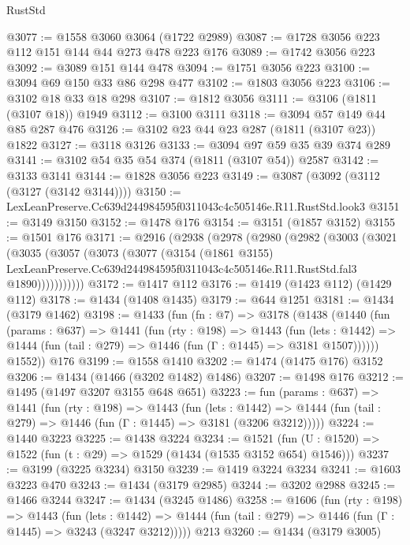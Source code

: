 \begin{lexlean}{RustStd}
\begin{coremodule}
@3077 := @1558 @3060 @3064 (@1722 @2989)
@3087 := @1728 @3056 @223 @112 @151 @144 @44 @273 @478 @223 @176
@3089 := @1742 @3056 @223
@3092 := @3089 @151 @144 @478
@3094 := @1751 @3056 @223
@3100 := @3094 @69 @150 @33 @86 @298 @477
@3102 := @1803 @3056 @223
@3106 := @3102 @18 @33 @18 @298
@3107 := @1812 @3056
@3111 := @3106 (@1811 (@3107 @18)) @1949
@3112 := @3100 @3111
@3118 := @3094 @57 @149 @44 @85 @287 @476
@3126 := @3102 @23 @44 @23 @287 (@1811 (@3107 @23)) @1822
@3127 := @3118 @3126
@3133 := @3094 @97 @59 @35 @39 @374 @289
@3141 := @3102 @54 @35 @54 @374 (@1811 (@3107 @54)) @2587
@3142 := @3133 @3141
@3144 := @1828 @3056 @223
@3149 := @3087 (@3092 (@3112 (@3127 (@3142 @3144))))
@3150 := LexLeanPreserve.Cc639d244984595f0311043c4c505146e.R11.RustStd.look3
@3151 := @3149 @3150
@3152 := @1478 @176
@3154 := @3151 (@1857 @3152)
@3155 := @1501 @176
@3171 := @2916
    (@2938
      (@2978
        (@2980
          (@2982
            (@3003
              (@3021
                (@3035
                  (@3057
                    (@3073
                      (@3077
                        (@3154
                          (@1861 @3155)
                          LexLeanPreserve.Cc639d244984595f0311043c4c505146e.R11.RustStd.fal3
                          @1890)))))))))))
@3172 := @1417 @112
@3176 := @1419 (@1423 @112) (@1429 @112)
@3178 := @1434 (@1408 @1435)
@3179 := @644 @1251
@3181 := @1434 (@3179 @1462)
@3198 := @1433
    (fun (fn : @7) =>
    @3178
      (@1438
        (@1440
          (fun (params : @637) =>
          @1441
            (fun (rty : @198) =>
            @1443
              (fun (lets : @1442) =>
              @1444 (fun (tail : @279) => @1446 (fun (Γ : @1445) => @3181 @1507))))))
        @1552))
    @176
@3199 := @1558 @1410
@3202 := @1474 (@1475 @176) @3152
@3206 := @1434 (@1466 (@3202 @1482) @1486)
@3207 := @1498 @176
@3212 := @1495 (@1497 @3207 @3155 @648 @651)
@3223 := fun (params : @637) =>
  @1441
    (fun (rty : @198) =>
    @1443
      (fun (lets : @1442) =>
      @1444 (fun (tail : @279) => @1446 (fun (Γ : @1445) => @3181 (@3206 @3212)))))
@3224 := @1440 @3223
@3225 := @1438 @3224
@3234 := @1521 (fun (U : @1520) => @1522 (fun (t : @29) => @1529 (@1434 (@1535 @3152 @654) @1546)))
@3237 := @3199 (@3225 @3234) @3150
@3239 := @1419 @3224 @3234
@3241 := @1603 @3223 @470
@3243 := @1434 (@3179 @2985)
@3244 := @3202 @2988
@3245 := @1466 @3244
@3247 := @1434 (@3245 @1486)
@3258 := @1606
    (fun (rty : @198) =>
    @1443
      (fun (lets : @1442) =>
      @1444 (fun (tail : @279) => @1446 (fun (Γ : @1445) => @3243 (@3247 @3212)))))
    @213
@3260 := @1434 (@3179 @3005)

\end{coremodule}
\end{lexlean}
